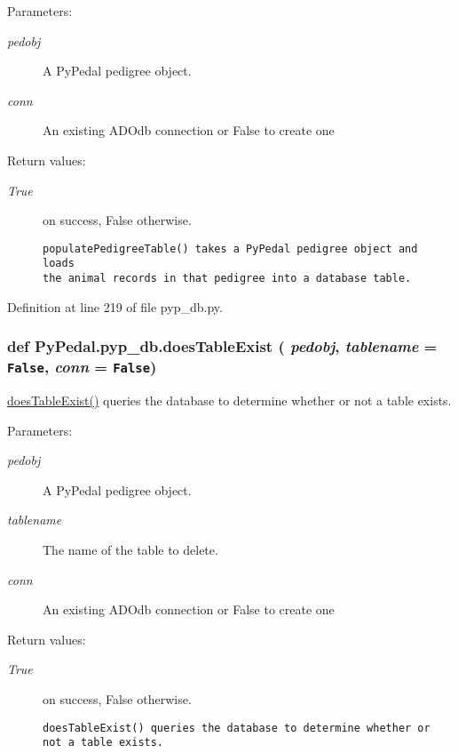 \begin{Desc}
\item[Parameters:]
\begin{description}
\item[{\em pedobj}]A Py\-Pedal pedigree object. \item[{\em conn}]An existing ADOdb connection or False to create one \end{description}
\end{Desc}
\begin{Desc}
\item[Return values:]
\begin{description}
\item[{\em True}]on success, False otherwise.

\footnotesize\begin{verbatim}populatePedigreeTable() takes a PyPedal pedigree object and loads
the animal records in that pedigree into a database table.
\end{verbatim}
\normalsize
 \end{description}
\end{Desc}


Definition at line 219 of file pyp\_\-db.py.\hypertarget{namespacePyPedal_1_1pyp__db_069600ee470533394697567dc1601e96}{
\subsubsection[doesTableExist]{\setlength{\rightskip}{0pt plus 5cm}def Py\-Pedal.pyp\_\-db.does\-Table\-Exist ( {\em pedobj},  {\em tablename} = {\tt False},  {\em conn} = {\tt False})}}
\label{namespacePyPedal_1_1pyp__db_069600ee470533394697567dc1601e96}


\hyperlink{namespacePyPedal_1_1pyp__db_069600ee470533394697567dc1601e96}{does\-Table\-Exist()} queries the database to determine whether or not a table exists. 

\begin{Desc}
\item[Parameters:]
\begin{description}
\item[{\em pedobj}]A Py\-Pedal pedigree object. \item[{\em tablename}]The name of the table to delete. \item[{\em conn}]An existing ADOdb connection or False to create one \end{description}
\end{Desc}
\begin{Desc}
\item[Return values:]
\begin{description}
\item[{\em True}]on success, False otherwise.

\footnotesize\begin{verbatim}doesTableExist() queries the database to determine whether or not a table exists.
\end{verbatim}
\normalsize
 \end{description}
\end{Desc}



